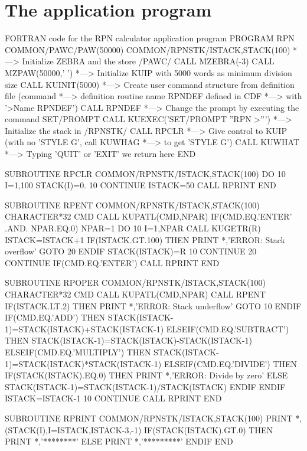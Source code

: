 \section{The application program}

\begin{XMPt}{FORTRAN code for the RPN calculator application program}
      PROGRAM RPN
      COMMON/PAWC/PAW(50000)
      COMMON/RPNSTK/ISTACK,STACK(100)
*---> Initialize ZEBRA and the store /PAWC/
      CALL MZEBRA(-3)
      CALL MZPAW(50000,' ')
*---> Initialize KUIP with 5000 words as minimum division size
      CALL KUINIT(5000)
*---> Create user command structure from definition file (command
*---> definition routine name RPNDEF defined in CDF 
*---> with '>Name RPNDEF')
      CALL RPNDEF
*---> Change the prompt by executing the command SET/PROMPT
      CALL KUEXEC('SET/PROMPT ''RPN >''')
*---> Initialize the stack in /RPNSTK/
      CALL RPCLR
*---> Give control to KUIP (with no 'STYLE G', call KUWHAG 
*---> to get 'STYLE G')
      CALL KUWHAT
*---> Typing 'QUIT' or 'EXIT' we return here
      END
 
      SUBROUTINE RPCLR
      COMMON/RPNSTK/ISTACK,STACK(100)
      DO 10 I=1,100
        STACK(I)=0.
10    CONTINUE
      ISTACK=50
      CALL RPRINT
      END
 
      SUBROUTINE RPENT
      COMMON/RPNSTK/ISTACK,STACK(100)
      CHARACTER*32 CMD
      CALL KUPATL(CMD,NPAR)
      IF(CMD.EQ.'ENTER' .AND. NPAR.EQ.0) NPAR=1
      DO 10 I=1,NPAR
        CALL KUGETR(R)
        ISTACK=ISTACK+1
        IF(ISTACK.GT.100) THEN
          PRINT *,'ERROR: Stack overflow'
          GOTO 20
        ENDIF
        STACK(ISTACK)=R
10    CONTINUE
20    CONTINUE
      IF(CMD.EQ.'ENTER') CALL RPRINT
      END
 
      SUBROUTINE RPOPER
      COMMON/RPNSTK/ISTACK,STACK(100)
      CHARACTER*32 CMD
      CALL KUPATL(CMD,NPAR)
      CALL RPENT
      IF(ISTACK.LT.2) THEN
        PRINT *,'ERROR: Stack underflow'
        GOTO 10
      ENDIF
      IF(CMD.EQ.'ADD') THEN
        STACK(ISTACK-1)=STACK(ISTACK)+STACK(ISTACK-1)
      ELSEIF(CMD.EQ.'SUBTRACT') THEN
        STACK(ISTACK-1)=STACK(ISTACK)-STACK(ISTACK-1)
      ELSEIF(CMD.EQ.'MULTIPLY') THEN
        STACK(ISTACK-1)=STACK(ISTACK)*STACK(ISTACK-1)
      ELSEIF(CMD.EQ.'DIVIDE') THEN
        IF(STACK(ISTACK).EQ.0) THEN
          PRINT *,'ERROR: Divide by zero'
        ELSE
          STACK(ISTACK-1)=STACK(ISTACK-1)/STACK(ISTACK)
        ENDIF
      ENDIF
      ISTACK=ISTACK-1
10    CONTINUE
      CALL RPRINT
      END

      SUBROUTINE RPRINT
      COMMON/RPNSTK/ISTACK,STACK(100)
      PRINT *,(STACK(I),I=ISTACK,ISTACK-3,-1)
      IF(STACK(ISTACK).GT.0) THEN
        PRINT *,'********'
      ELSE 
        PRINT *,'*********'
      ENDIF
      END
\end{XMPt}
\Rind[KUPATL]{}
\Rind[KUGETR]{}
%
%
